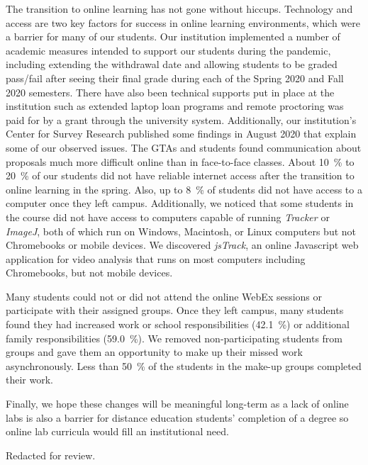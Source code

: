 \documentclass[aip, numerical, preprint]{revtex4-2}
\begin{document}
The transition to online learning has not gone without hiccups.  Technology and access are two
key factors for success in online learning environments, which were a barrier for many of our
students.  Our institution implemented a number of academic measures intended to support our
students during the pandemic, including extending the withdrawal date and allowing students to
be graded pass/fail after seeing their final grade during each of the Spring 2020 and Fall 2020
semesters. There have also been technical supports put in place at the institution such as
extended laptop loan programs and remote proctoring was paid for by a grant through the
university system. Additionally, our institution's Center for Survey Research published
some findings in August 2020 that explain some of our observed
issues.\citep{ECUcovidSurveyRedacted} The GTAs and students found communication about proposals
much more difficult online than in face-to-face classes.  About \SI{10}{\percent} to
\SI{20}{\percent} of our students did not have reliable internet access after the transition to
online learning in the spring.\citep{ECUcovidSurveyRedacted} Also, up to \SI{8}{\percent} of
students did not have access to a computer once they left campus.\citep{ECUcovidSurveyRedacted}
Additionally, we noticed that some students in the course did not have access to computers
capable of running \emph{Tracker} or \emph{ImageJ}, both of which run on Windows, Macintosh, or
Linux computers but not Chromebooks or mobile devices. We discovered
\emph{jsTrack}\citep{jstrack}, an online Javascript web application for video analysis that
runs on most computers including Chromebooks, but not mobile devices.

Many students could not or did not attend the online WebEx sessions or participate with their
assigned groups.  Once they left campus, many students found they had increased work or school
responsibilities (\SI{42.1}{\percent}) or additional family responsibilities
(\SI{59.0}{\percent}).\citep{ECUcovidSurveyRedacted} We removed non-participating students from
groups and gave them an opportunity to make up their missed work asynchronously. Less than
\SI{50}{\percent} of the students in the make-up groups completed their work.

Finally, we hope these changes will be meaningful long-term as a lack of online labs is also a
barrier for distance education students' completion of a degree so online lab curricula would
fill an institutional need.


\begin{acknowledgments}
  Redacted for review.%
\end{acknowledgments}


\end{document}
